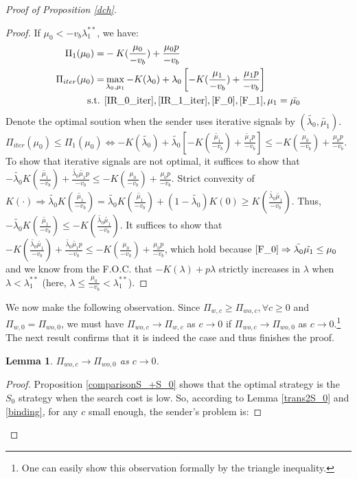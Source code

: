 \documentclass[11pt]{extarticle}
\newtheorem{lemma}{Lemma}
\newcommand{\lra}{\Leftrightarrow}
\newcommand{\ra}{\Rightarrow}
\begin{document}
\begin{proof}[Proof of Proposition \ref{dch}]
\begin{proof}
		If $\mu_0 < - v_b \lambda_1^{**}$, we have:
		\begin{align*}
		\Pi_1(\mu_0) =& -K(\frac{\mu_0}{-v_b})+\frac{\mu_0 p}{-v_b}\\
		\Pi_{iter}(\mu_0) =& \max\limits_{\lambda_0, \mu_1} -K(\lambda_0) + \lambda_0 \left[-K(\frac{\mu_1}{-v_b})+\frac{\mu_1 p}{-v_b} \right]\\
		\text{s.t. } &\eqref{IR_0_iter}, \eqref{IR_1_iter}, \eqref{F_0}, \eqref{F_1}, \mu_1 = \bar{\mu_0}
		\end{align*}
		Denote the optimal soution when the sender uses iterative signals by $(\tilde{\lambda_0}, \tilde{\mu_1})$. $\Pi_{iter}(\mu_0) \leq \Pi_1(\mu_0) \lra -K(\tilde{\lambda_0}) + \tilde{\lambda_0} \left[-K(\frac{\tilde{\mu_1}}{-v_b})+\frac{\tilde{\mu_1} p}{-v_b} \right] \leq -K(\frac{\mu_0}{-v_b})+\frac{\mu_0 p}{-v_b}$. To show that iterative signals are not optimal, it suffices to show that $-\tilde{\lambda_0} K(\frac{\tilde{\mu_1}}{-v_b})+\frac{\tilde{\lambda_0}\tilde{\mu_1} p}{-v_b} \leq -K(\frac{\mu_0}{-v_b})+\frac{\mu_0 p}{-v_b}$. Strict convexity of $K(\cdot) \ra \tilde{\lambda_0} K(\frac{\tilde{\mu_1}}{-v_b}) = \tilde{\lambda_0} K(\frac{\tilde{\mu_1}}{-v_b}) + (1-\tilde{\lambda_0}) K(0) \geq K(\frac{\tilde{\lambda_0} \tilde{\mu_1}}{-v_b})$. Thus, $-\tilde{\lambda_0} K(\frac{\tilde{\mu_1}}{-v_b}) \leq - K(\frac{\tilde{\lambda_0} \tilde{\mu_1}}{-v_b})$. It suffices to show that $- K(\frac{\tilde{\lambda_0} \tilde{\mu_1}}{-v_b}) +\frac{\tilde{\lambda_0}\tilde{\mu_1} p}{-v_b} \leq -K(\frac{\mu_0}{-v_b})+\frac{\mu_0 p}{-v_b}$, which hold because $\eqref{F_0} \ra \tilde{\lambda_0} \tilde{\mu_1} \leq \mu_0$ and we know from the F.O.C. that $-K(\lambda) + p \lambda$ strictly increases in $\lambda$ when $\lambda < \lambda_1^{**}$ (here, $\lambda \leq \frac{\mu_0}{-v_b} < \lambda_1^{**}$).
	\end{proof}
	We now make the following observation. Since $\Pi_{w,c} \geq \Pi_{wo,c},\forall c \geq 0$ and $\Pi_{w,0} = \Pi_{wo,0}$, we must have $\Pi_{wo,c} \rightarrow \Pi_{w,c}$ as $c \rightarrow 0$ if $\Pi_{wo,c} \rightarrow \Pi_{wo,0}$ as $c \rightarrow 0$.\footnote{One can easily show this observation formally by the triangle inequality.} The next result confirms that it is indeed the case and thus finishes the proof.
	\begin{lemma}
		$\Pi_{wo,c} \rightarrow \Pi_{wo,0}$ as $c \rightarrow 0$.
	\end{lemma}
	\begin{proof}
		Proposition \ref{comparisonS_+S_0} shows that the optimal strategy is the $S_0$ strategy when the search cost is low. So, according to Lemma \ref{trans2S_0} and \ref{binding}, for any $c$ small enough, the sender's problem is:

\end{proof}
\end{proof}
\end{document}
